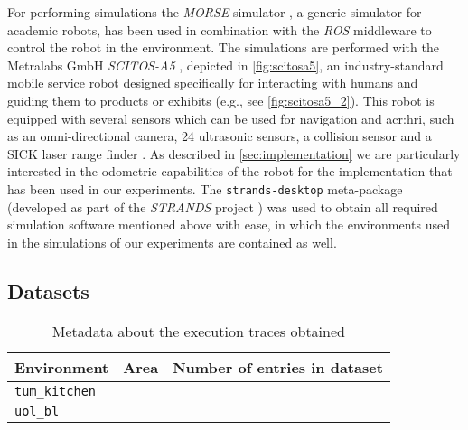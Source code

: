 For performing simulations the \textit{MORSE} simulator \cite{morse_simpar_2012}, a generic simulator for academic robots, has been used in combination with the \textit{ROS} middleware to control the robot in the environment.
The simulations are performed with the Metralabs GmbH \textit{SCITOS-A5} \cite{Metralabs}, depicted in \autoref{fig:scitosa5}, an industry-standard mobile service robot designed specifically for interacting with humans and guiding them to products or exhibits (e.g., see \autoref{fig:scitosa5_2}).
This robot is equipped with several sensors which can be used for navigation and \acrfull{acr:hri}, such as an omni-directional camera, 24 ultrasonic sensors, a collision sensor and a SICK laser range finder \cite{gross2008shopbot}.
As described in \autoref{sec:implementation} we are particularly interested in the odometric capabilities of the robot for the implementation that has been used in our experiments.
The \texttt{strands-desktop} meta-package (developed as part of the \textit{STRANDS} project \cite{hawes2016strands}) was used to obtain all required simulation software mentioned above with ease, in which the environments used in the simulations of our experiments are contained as well.



%


\subsection{Datasets}
\label{sec:datasets}

\begin{table}[pt]
	\caption{Metadata about the execution traces obtained}
	\label{tab:datasets-environments}\centering
	\begin{tabular}{|l|l|l|}
	\hline
	\textbf{Environment} & \textbf{Area} & \textbf{Number of entries in dataset} \\
	\hline
	\texttt{tum\_kitchen}&               &                                       \\
	\hline
	\texttt{uol\_bl}&               &            						\\ \hline          
	\end{tabular}
\end{table}

